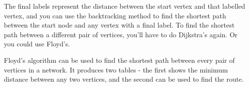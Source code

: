 \documentclass[../main.tex]{subfile}
\begin{document}
\begin{figure}[H]
\centering
{}
\end{figure}

The final labels represent the distance between the start vertex and that labelled vertex, and you can use the backtracking method to find the shortest path between the start node and any vertex with a final label. To find the shortest path between a different pair of vertices, you'll have to do Dijkstra's again. Or you could use Floyd's.


Floyd's algorithm can be used to find the shortest path between every pair of vertices in a network. It produces two tables - the first shows the minimum distance between any two vertices, and the second can be used to find the route.
\end{document}
